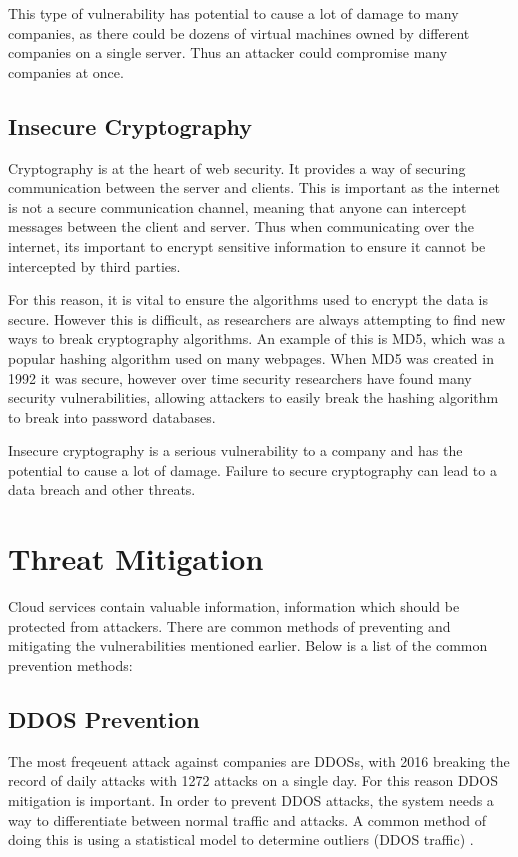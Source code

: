 This type of vulnerability has potential to cause a lot of damage to many companies, as there could be dozens of virtual machines owned by different companies on a single server. Thus an attacker could compromise many companies at once.

\subsection{Insecure Cryptography}

Cryptography is at the heart of web security. It provides a way of securing communication between the server and clients. This is important as the internet is not a secure communication channel\cite{nisha_overview_2010}, meaning that anyone can intercept messages between the client and server. Thus when communicating over the internet, its important to encrypt sensitive information to ensure it cannot be intercepted by third parties.

For this reason, it is vital to ensure the algorithms used to encrypt the data is secure. However this is difficult, as researchers are always attempting to find new ways to break cryptography algorithms. An example of this is MD5, which was a popular hashing algorithm used on many webpages. When MD5 was created in 1992 it was secure, however over time security researchers have found many security vulnerabilities\cite{ora_data_2015}, allowing attackers to easily break the hashing algorithm to break into password databases.

Insecure cryptography is a serious vulnerability to a company and has the potential to cause a lot of damage. Failure to secure cryptography can lead to a data breach and other threats.

\section{Threat Mitigation}

Cloud services contain valuable information, information which should be protected from attackers. There are common methods of preventing and mitigating the vulnerabilities mentioned earlier. Below is a list of the common prevention methods:

\subsection{DDOS Prevention}

The most freqeuent attack against companies are DDOSs, with 2016 breaking the record of daily attacks with 1272 attacks on a single day\cite{kaspersky_kaspersky_2016}. For this reason DDOS mitigation is important. In order to prevent DDOS attacks, the system needs a way to differentiate between normal traffic and attacks. A common method of doing this is using a statistical model to determine outliers (DDOS traffic) \cite{hoque_botnet_2015}.

